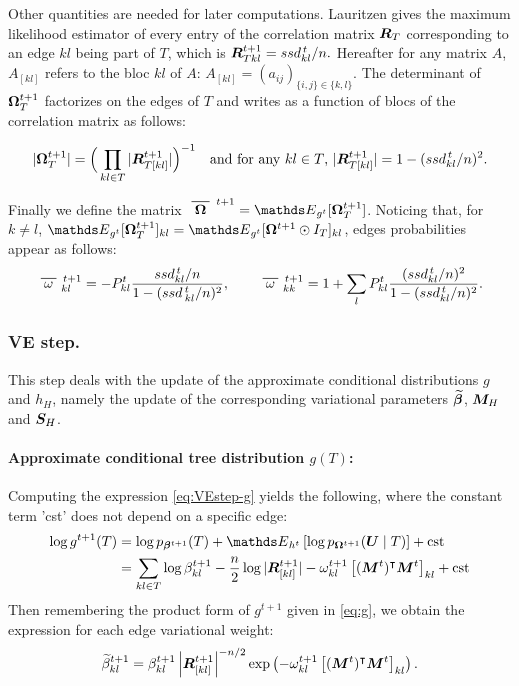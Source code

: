 Other quantities are needed for later computations. Lauritzen  gives the maximum likelihood estimator of every entry of the correlation matrix ${\boldsymbol{R}}_T$ corresponding to an edge $kl$ being part of $T$, which is
$ {\boldsymbol{R}}_{Tkl}^{t+1} = ssd_{kl}^{\,t}/n. $
Hereafter for any matrix $A$, $A_{[kl]}$ refers to the bloc $kl$ of $A$: $A_{[kl]}=(a_{ij})_{\{i,j\}\in\{k,l\}}$. The determinant of ${\boldsymbol{\Omega}}^{t+1}_T$ factorizes on the edges of $T$ and writes as a function of blocs of the correlation matrix  as follows:  

\begin{align}
    |{\boldsymbol{\Omega}}^{t+1}_{T}| = \Big(\prod_{kl \in T} |{\boldsymbol{R}}_{T[kl]}^{t+1}|\Big)^{-1}
\quad 
\text{and for any $kl \in T$, } 
|{\boldsymbol{R}}_{T[kl]}^{t+1}|= 1-(ssd_{kl}^{\,t}/n)^2. \label{RT}
\end{align}

 
Finally we define the matrix  $\xbar{\Omegabf}^{\,t+1} = \Esp_{g^t}[\Omegabf^{t+1}_T]$. 
Noticing that, for $k \neq l$, $\Esp_{g^t}[\Omegabf^{t+1}_T]_{kl} = \Esp_{g^t}[\Omegabf^{t+1} \odot I_T]_{kl}$, edges probabilities appear as follows:
$$
\xbar{\omega}_{kl}^{\,t+1} 
= - P_{kl}^t\dfrac{ ssd_{kl}^{\,t}/n}{1-(ssd\,^t_{kl}/n)^2}, 
\qquad 
\xbar{\omega}_{kk}^{\,t+1}= 1+\sum_l P_{kl}^t \dfrac{(ssd_{kl}^{\,t}/n)^2}{1-(ssd_{kl}^{\,t}/n)^2}.
$$

 
\subsubsection*{VE step.} 
This step deals with the update of the approximate conditional distributions $g$ and $h_H$, namely the update of the corresponding variational parameters ${\widetilde{{\boldsymbol{\beta}}}}$, ${\boldsymbol{M}}_H$ and ${\boldsymbol{S}}_H$.

\paragraph{Approximate conditional tree distribution $g(T)$:}
Computing the expression \eqref{eq:VEstep-g} yields the following, where the constant term 'cst' does not depend on a specific edge:
\begin{align*}
 \log g^{t+1}(T) &= \log p_{\betabf^{t+1}}(T) + \Esp_{h^t} \left[ \log p_{\Omegabf^{t+1}}(\Ubf \mid T) \right]  + \text{cst}  \\
&=  \sum_{kl \in T} \log \beta^{t+1}_{kl} 
- \frac{n}2 \log |\Rbf_{[kl]}^{t+1} | 
-  \omega^{t+1}_{kl} \left[(\Mbf^t)^\intercal \Mbf^t\right]_{kl} + \text{cst}
\end{align*}
  Then remembering the product form of  $g^{t+1}$ given in \eqref{eq:g}, we obtain the expression for each edge variational weight:
  \begin{equation}
      {\widetilde{\beta}}^{t+1}_{kl} = \beta^{t+1}_{kl} \left|{\boldsymbol{R}}_{[kl]}^{t+1}\right|^{-n/2} \exp\left(-\omega^{t+1}_{kl} \left[({\boldsymbol{M}}^t)^\intercal {\boldsymbol{M}}^t\right]_{kl}\right).
  \end{equation}
 

